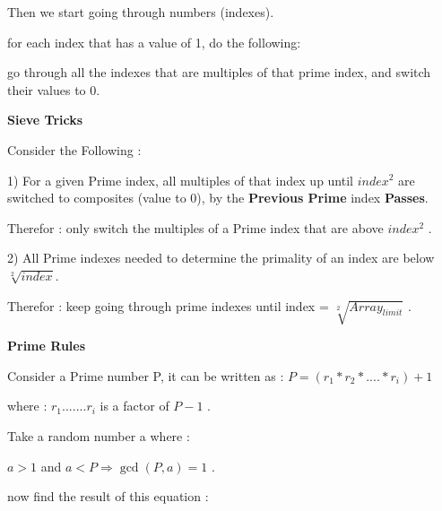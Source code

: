 \documentclass{slides}
\begin{document}
\begin{center}
Then we start going through numbers (indexes).
\end{center}
\begin{center}
 for each index that has a value of 1, do the following:
\end{center}
\begin{center}
go through all the indexes that are multiples of that prime index, and switch their values to 0.
\end{center}
\newpage
\begin{center}
\textbf{\Large Sieve Tricks}
\end{center}
\begin{center}
Consider the Following :
\end{center}
\begin{center}
1) For a given Prime index, all multiples of that index up until $ index^2 $ are switched to composites (value to 0), by the \textbf{Previous Prime} index \textbf{Passes}.
\end{center}
\begin{center}
Therefor : only switch the multiples of a Prime index that are above $ index^2 $ .
\end{center}
\begin{center}
2) All Prime indexes needed to determine the primality of an index are below $ \sqrt[2]{index} $.
\end{center}
\begin{center}
Therefor : keep going through prime indexes until index = $\sqrt[2]{Array_{limit}}$ .
\end{center}
\newpage
\begin{center}
\textbf{\Large Prime Rules}
\end{center}
\begin{center}
Consider a Prime number P, it can be written as :
$ P = (r_{1} * r_{2} *....* r_{i})+1$
\end{center}
\begin{center}
where : $r_{1}.......r_{i} $ is a factor of $ P-1 $ .
\end{center}
\begin{center}
Take a random number a where :
\end{center}
\begin{center}
$ a>1 $ and $ a<P  \Rightarrow  \gcd(P,a)=1 $ .
\end{center}
\begin{center}
now find the result of this equation :
\end{center}
\end{document}
